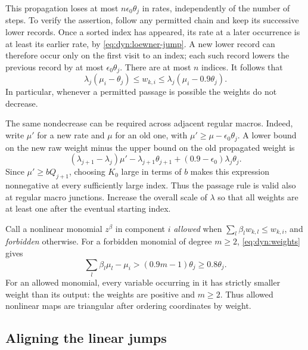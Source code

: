 This propagation loses at most $n\epsilon_0\theta_j$ in rates,
independently of the number of steps.  To verify the assertion, follow
any permitted chain and keep its successive lower records.  Once a
sorted index has appeared, its rate at a later occurrence is at least
its earlier rate, by \eqref{eq:dyn:loewner-jump}.  A new lower record
can therefore occur only on the first visit to an index; each such
record lowers the previous record by at most
$\epsilon_0\theta_j$.  There are at most $n$ indices.  It follows that
\begin{equation}
 \lambda_j(\mu_i-\theta_j)\le w_{k,i}
 \le\lambda_j(\mu_i-0.9\theta_j).
 \label{eq:dyn:weights}
\end{equation}
In particular, whenever a permitted passage is possible the weights
do not decrease.

The same nondecrease can be required across adjacent regular macros.
Indeed, write $\mu'$ for a new rate and $\mu$ for an old one, with
$\mu'\ge\mu-\epsilon_0\theta_j$.  A lower bound on the new raw weight
minus the upper bound on the old propagated weight is
\[
 (\lambda_{j+1}-\lambda_j)\mu'
 -\lambda_{j+1}\theta_{j+1}
 +(0.9-\epsilon_0)\lambda_j\theta_j.
\]
Since $\mu'\ge bQ_{j+1}$, choosing $K_0$ large in terms of $b$ makes
this expression nonnegative at every sufficiently large index.
Thus the passage rule is valid also at regular macro junctions.
Increase the overall scale of $\lambda$ so that all weights are at
least one after the eventual starting index.

Call a nonlinear monomial $z^\beta$ in component $i$ \emph{allowed}
when $\sum_l\beta_lw_{k,l}\le w_{k,i}$, and \emph{forbidden} otherwise.
For a forbidden monomial of degree $m\ge2$,
\eqref{eq:dyn:weights} gives
\begin{equation}
 \sum_l\beta_l\mu_l-\mu_i
 >(0.9m-1)\theta_j\ge0.8\theta_j.
 \label{eq:dyn:forbidden-gap}
\end{equation}
For an allowed monomial, every variable occurring in it has strictly
smaller weight than its output: the weights are positive and $m\ge2$.
Thus allowed nonlinear maps are triangular after ordering coordinates
by weight.

\subsection{Aligning the linear jumps}


